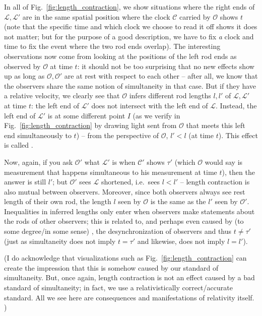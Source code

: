 \documentclass[../relativity_main.tex]{subfiles}
\begin{document}
In all of Fig.~\ref{fig:length_contraction}, we show situations where the right ends of $\mathcal{L}, \mathcal{L}'$ are in the same spatial position where the clock $\mathcal{C}$ carried by $\mathcal{O}$ shows $t$ (note that the specific time and which clock we choose to read it off shows it does not matter; but for the purpose of a good description, we have to fix \emph{a} clock and time to fix the event where the two rod ends overlap). The interesting observations now come from looking at the positions of the left rod ends as observed by $\mathcal{O}$ at time $t$: it should not be too surprising that no new effects show up as long as $\mathcal{O}, \mathcal{O}'$ are at rest with respect to each other -- after all, we know that the observers share the same notion of simultaneity in that case. But if they have a relative velocity, we clearly see that $\mathcal{O}$ infers different rod lengths $l, l'$ of $\mathcal{L}, \mathcal{L}'$ at time $t$: the left end of $\mathcal{L}'$ does not intersect with the left end of $\mathcal{L}$. Instead, the left end of $\mathcal{L}'$ is at some different point $I$ (as we verify in Fig.~\ref{fig:length_contraction} by drawing light sent from $\mathcal{O}$ that meets this left end simultaneously to $t$) -- from the perspective of $\mathcal{O}$, $l' < l$ (at time $t$). This effect is called .

Now, again, if you ask $\mathcal{O}'$ what $\mathcal{L}'$ is when $\mathcal{C}'$ shows $\tau'$ (which $\mathcal{O}$ would say is measurement that happens simultaneous to his measurement at time $t$), then the answer is still $l'$; but $\mathcal{O}'$ sees $\mathcal{L}$ shortened, i.e.~sees $l < l'$ -- length contraction is also mutual between observers. Moreover, since both observers always see rest length of their own rod, the length $l$ seen by $\mathcal{O}$ is the same as the $l'$ seen by $\mathcal{O}'$. Inequalities in inferred lengths only enter when observers make statements about the rods of other observers; this is related to, and perhaps even caused by (to some degree/in some sense) , the desynchronization of observers and thus $t \neq \tau'$ (just as simultaneity does not imply $t = \tau'$ and likewise, does not imply $l = l'$).


(I do acknowledge that visualizations such as Fig.~\ref{fig:length_contraction} can create the impression that this is somehow caused by our standard of simultaneity. But, once again, length contraction is not an effect caused by a bad standard of simultaneity; in fact, we use a relativistically correct/accurate standard.%
All we see here are consequences and manifestations of relativity itself.%
)
\end{document}
